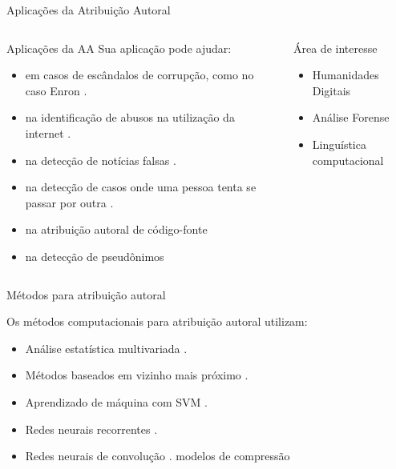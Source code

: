 \begin{frame}{Aplicações da Atribuição Autoral}

\begin{columns}
	\begin{column}{0.65\textwidth}
		\begin{alertblock}{Aplicações da AA}
			Sua aplicação pode ajudar: 
			\begin{itemize}\itemsep9pt
				\item  em casos de escândalos de corrupção, como no caso Enron
				 \cite{corpusEnron,Chen2011}.
				\item na identificação de abusos na utilização da internet \cite{Gillam2012quite}.
				\item na detecção de notícias falsas \cite{Peng2016}.
				\item na detecção de casos onde uma pessoa tenta se passar por outra \cite{Koppel2018_pseud}.
				\item na atribuição autoral de código-fonte \cite{Alsulami2017}
				\item na detecção de pseudônimos \cite{Juola15}
				
			\end{itemize}
		\end{alertblock}
	\end{column}
	\begin{column}{0.3\textwidth}  %
		\begin{alertblock}{Área de interesse}
			\begin{itemize}
				\item Humanidades Digitais
				\item Análise Forense
				\item Linguística computacional
			\end{itemize}
		\end{alertblock}
	\end{column}
\end{columns}

\end{frame}


\begin{frame}{Métodos para atribuição autoral}

Os métodos computacionais para atribuição autoral utilizam: 
\begin{itemize}
  \item Análise estatística multivariada \cite{Savoy2016,AA_delta2017}.
  \item Métodos baseados em vizinho mais próximo \cite{Kocher2017Verificacao,Koppel2018_pseud,Varela2016}.
  \item Aprendizado de máquina com SVM \cite{Schwartz2013,aa-distortion}.
  \item Redes neurais recorrentes \cite{Bagnall2016}.
  \item Redes neurais de convolução \cite{Shrestha2017,Sari2016}.
  modelos de compressão \cite{Halvani2018}
\end{itemize}

\end{frame}

